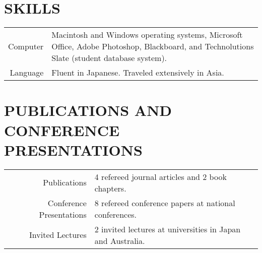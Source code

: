 \documentclass[a4paper, 12pt]{classycv}
\begin{document}
\begin{resume}
    \section{\MakeUppercase{Skills}}

    \begin{tabular}[\textwidth]{rp{}}
        \alert{Computer} & Macintosh and Windows operating systems, Microsoft Office, Adobe Photoshop, Blackboard, and Technolutions Slate (student database system).
        \\\alert{Language} & Fluent in Japanese. Traveled extensively in Asia.
    \end{tabular}

    \section{\MakeUppercase{Publications and Conference Presentations}}

    \begin{tabular}[\textwidth]{rp{}}
        \alert{Publications} & 4 refereed journal articles and 2 book chapters.
        \\\alert{Conference Presentations} & 8 refereed conference papers at national conferences.
        \\\alert{Invited Lectures} & 2 invited lectures at universities in Japan and Australia.
    \end{tabular}
\end{resume}

%
%

\end{document}
